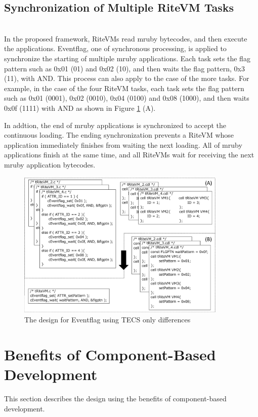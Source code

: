 \documentclass[a4j,12pt,oneside,openany,english]{jsbook}
\begin{document}
\subsection{Synchronization of Multiple RiteVM Tasks} \mbox{}\\

In the proposed framework, RiteVMs read mruby bytecodes, and then execute the applications.
Eventflag, one of synchronous processing, is applied to synchronize the starting of multiple mruby applications.
Each task sets the flag pattern such as 0x01 (01) and 0x02 (10), and then waits the flag pattern, 0x3 (11), with AND.
This process can also apply to the case of the more tasks.
For example, in the case of the four RiteVM tasks, each task sets the flag pattern such as 0x01 (0001), 0x02 (0010), 0x04 (0100)  and 0x08 (1000), and then waits 0x0f (1111) with AND as shown in Figure \ref{fig:Eventflag} (A).

In addtion, the end of mruby applications is synchronized to accept the continuous loading.
The ending synchronization prevents a RiteVM whose application immediately finishes from waiting the next loading.
All of mruby applications finish at the same time, and all RiteVMs wait for receiving the next mruby application bytecodes. 

\begin{figure}[t]
    \centering
    \includegraphics[width=10cm,clip]{../EMSOFT2016/figure/Eventflag.pdf}
    \caption{The design for Eventflag using TECS {\scriptsize *only differences}}
    \label{fig:Eventflag}
\end{figure}
 
\section{Benefits of Component-Based Development}
This section describes the design using the benefits of component-based development.
\end{document}
